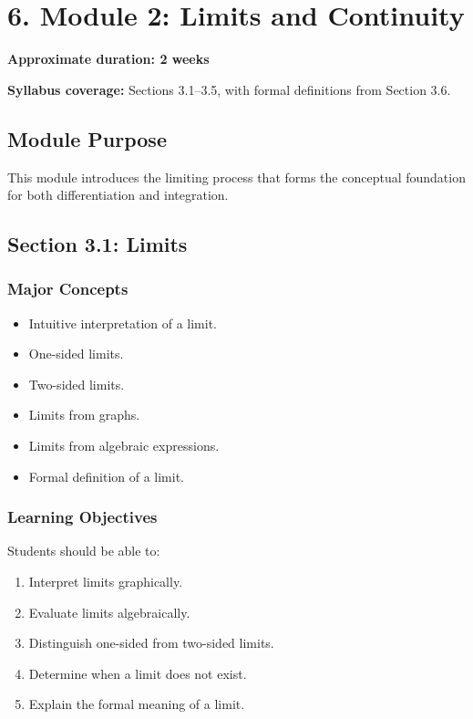 \documentclass[11pt]{article}
\begin{document}
\section{6. Module 2: Limits and Continuity}

\textbf{Approximate duration: 2 weeks}

\textbf{Syllabus coverage:} Sections 3.1--3.5, with formal definitions
from Section 3.6.

\subsection{Module Purpose}

This module introduces the limiting process that forms the conceptual foundation
for both differentiation and integration.

\subsection{Section 3.1: Limits}

\subsubsection{Major Concepts}

\begin{itemize}
    \item Intuitive interpretation of a limit.
    \item One-sided limits.
    \item Two-sided limits.
    \item Limits from graphs.
    \item Limits from algebraic expressions.
    \item Formal definition of a limit.
\end{itemize}

\subsubsection{Learning Objectives}

Students should be able to:

\begin{enumerate}
    \item Interpret limits graphically.
    \item Evaluate limits algebraically.
    \item Distinguish one-sided from two-sided limits.
    \item Determine when a limit does not exist.
    \item Explain the formal meaning of a limit.
\end{enumerate}
\end{document}
